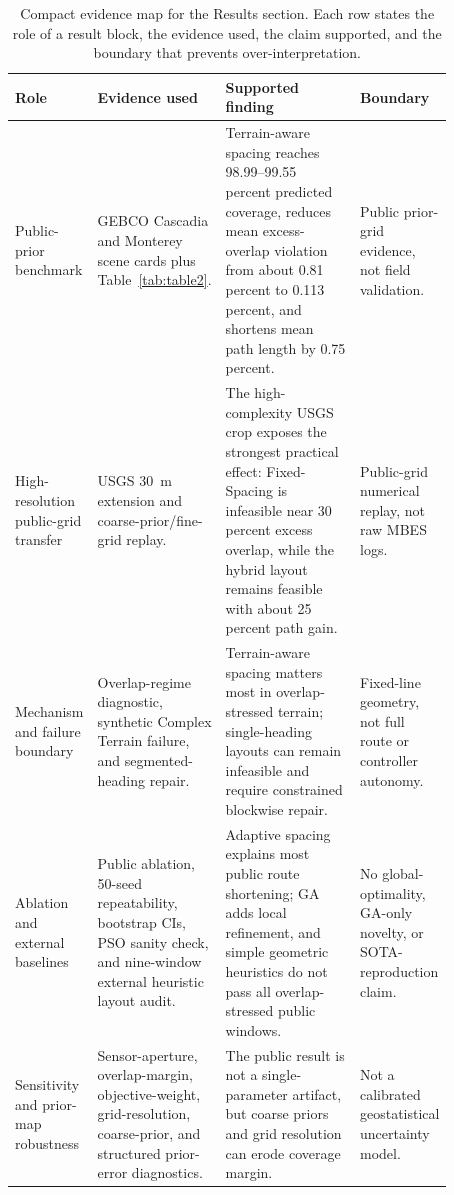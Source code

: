 \documentclass[jmse,article,submit,moreauthors]{Definitions/mdpi}
\begin{document}
\begin{table}[!htbp]
	\centering
	\caption{Compact evidence map for the Results section. Each row states the role of a result block, the evidence used, the claim supported, and the boundary that prevents over-interpretation.}
	\label{tab:evidence_map}
	\scriptsize
	\renewcommand{\arraystretch}{1.08}
	\setlength{\tabcolsep}{3.0pt}
	\begin{tabular}{@{}>{\raggedright\arraybackslash}p{0.18\linewidth}>{\raggedright\arraybackslash}p{0.25\linewidth}>{\raggedright\arraybackslash}p{0.31\linewidth}>{\raggedright\arraybackslash}p{0.13\linewidth}@{}}
		\toprule[1bp]
		\textbf{Role} & \textbf{Evidence used} & \textbf{Supported finding} & \textbf{Boundary} \\
		\midrule[1bp]
		Public-prior benchmark & GEBCO Cascadia and Monterey scene cards plus Table~\ref{tab:table2}. & Terrain-aware spacing reaches 98.99--99.55 percent predicted coverage, reduces mean excess-overlap violation from about 0.81 percent to 0.113 percent, and shortens mean path length by 0.75 percent. & Public prior-grid evidence, not field validation. \\
		High-resolution public-grid transfer & USGS 30~m extension and coarse-prior/fine-grid replay. & The high-complexity USGS crop exposes the strongest practical effect: Fixed-Spacing is infeasible near 30 percent excess overlap, while the hybrid layout remains feasible with about 25 percent path gain. & Public-grid numerical replay, not raw MBES logs. \\
		Mechanism and failure boundary & Overlap-regime diagnostic, synthetic Complex Terrain failure, and segmented-heading repair. & Terrain-aware spacing matters most in overlap-stressed terrain; single-heading layouts can remain infeasible and require constrained blockwise repair. & Fixed-line geometry, not full route or controller autonomy. \\
		Ablation and external baselines & Public ablation, 50-seed repeatability, bootstrap CIs, PSO sanity check, and nine-window external heuristic layout audit. & Adaptive spacing explains most public route shortening; GA adds local refinement, and simple geometric heuristics do not pass all overlap-stressed public windows. & No global-optimality, GA-only novelty, or SOTA-reproduction claim. \\
		Sensitivity and prior-map robustness & Sensor-aperture, overlap-margin, objective-weight, grid-resolution, coarse-prior, and structured prior-error diagnostics. & The public result is not a single-parameter artifact, but coarse priors and grid resolution can erode coverage margin. & Not a calibrated geostatistical uncertainty model. \\

\end{tabular}
\end{table}
\end{document}
